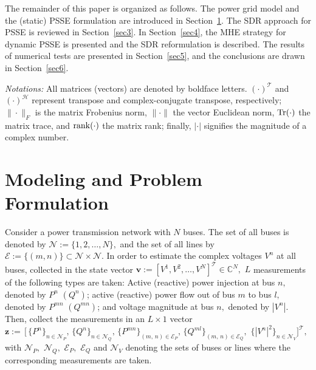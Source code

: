 \documentclass[conference]{IEEEtran}
\def\ccalE{{\ensuremath{\mathcal E}}}
\def\ccalH{{\ensuremath{\mathcal H}}}
\def\ccalN{{\ensuremath{\mathcal N}}}
\def\ccalT{{\ensuremath{\mathcal T}}}
\def\bbv{{\ensuremath{\mathbf v}}}
\def\bbz{{\ensuremath{\mathbf z}}}
\begin{document}
The remainder of this paper is organized as follows. The power grid model and the (static) PSSE formulation are introduced in Section~\ref{sec2}. The SDR approach for PSSE is reviewed in Section~\ref{sec3}. In Section~\ref{sec4}, the MHE strategy for dynamic PSSE is presented and the SDR reformulation is described. The results of numerical tests are presented in Section~\ref{sec5}, and the conclusions are drawn in Section~\ref{sec6}.

\emph{Notations:} All matrices (vectors) are denoted by boldface letters. $(\cdot)^\ccalT$ and $(\cdot)^\ccalH$ represent transpose and complex-conjugate transpose, respectively; $\|\cdot\|_F$ is the matrix Frobenius norm, $\|\cdot\|$ the vector Euclidean norm, ${\rm{Tr}}(\cdot)$ the matrix trace, and ${\rm{rank}}(\cdot)$ the matrix rank; finally, $|\cdot|$ signifies the magnitude of a complex number.



\section{Modeling and Problem Formulation}
\label{sec2}
Consider a power transmission network with $N$ buses. The set of all buses is denoted by $\ccalN\!:=\!\{1,2,\ldots,N\},$ and the set of all lines by $\ccalE\!:=\!\{(m,n)\}\!\subset\!\ccalN\times\ccalN.$ In order to estimate the complex voltages $V^n$ at all buses, collected in the state vector $\bbv\!:=\!\left[V^1,V^2,\ldots,V^N\right]^\ccalT\!\!\in\!\mathbb{C}^N,$ $L$ measurements of the following types are taken: Active (reactive) power injection at bus $n,$ denoted by $P^n$ $(Q^n)$; active (reactive) power flow out of bus $m$ to bus $l,$ denoted by $P^{mn}$ $(Q^{mn})$; and voltage magnitude at bus $n,$ denoted by $|V^n|$.
Then, collect the measurements in an $L\times 1$ vector $\bbz:=\,\big[\,\{P^n\}_{n\in\ccalN_P},\,\{Q^n\}_{n\in\ccalN_Q},\, \{P^{mn}\}_{(m,\,n)\in\ccalE_P},\,\{Q^{ml}\}_{(m,\,n)\in\ccalE_Q},$ $\{|V^n|^2\}_{n\in\ccalN_V}\big]^\ccalT,$ with $\ccalN_P,$ $\ccalN_Q,$ $\ccalE_P,$ $\ccalE_Q$ and $\ccalN_V$ denoting the sets of buses or lines where the corresponding measurements are taken.
\end{document}
